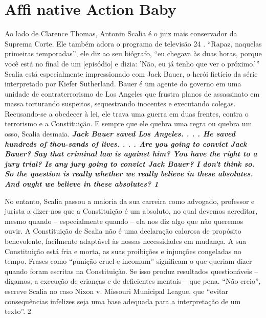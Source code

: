  
 \chapter{Afﬁ native Action Baby}  

 \label{Afﬁ native Action Baby}  
 
 
\par
 
 
 \textit{	}  

 
\par
 
 
 
\par
 

 \textbf{\textit{	} }  

 
\par
 
Ao lado de Clarence Thomas, Antonin Scalia é o juiz mais conservador da Suprema Corte. Ele também adora o programa de televisão
 {\color{blue} 24}  
. “Rapaz, naquelas primeiras temporadas”, ele diz ao seu biógrafo, “eu chegava às duas horas, porque você está no final de um [episódio] e dizia: 'Não, eu já tenho que ver o próximo.'” Scalia está especialmente impressionado com Jack Bauer, o herói fictício da série interpretado por Kiefer Sutherland. Bauer é um agente do governo em uma unidade de contraterrorismo de Los Angeles que frustra planos de assassinato em massa torturando suspeitos, sequestrando inocentes e executando colegas. Recusando-se a obedecer à lei, ele trava uma guerra em duas frentes, contra o terrorismo e a Constituição. E sempre que ele quebra uma regra ou quebra um osso, Scalia desmaia.
 \textbf{\textit{Jack Bauer saved Los Angeles. . . . He saved hundreds of thou-sands of lives. . . . Are you going to convict Jack Bauer? Say that criminal law is against him? You have the right to a jury trial? Is any jury going to convict Jack Bauer? I don’t think so. So the question is really whether we really believe in these absolutes. And ought we believe in these absolutes? 1} } 

 
\par
 
No entanto, Scalia passou a maioria da sua carreira como advogado, professor e jurista a dizer-nos que a Constituição é um absoluto, no qual devemos acreditar, mesmo quando – especialmente quando – ela nos diz algo que não queremos ouvir. A Constituição de Scalia não é uma declaração calorosa de propósito benevolente, facilmente adaptável às nossas necessidades em mudança. A sua Constituição está fria e morta, as suas proibições e injunções congeladas no tempo. Frases como “punição cruel e incomum” significam o que queriam dizer quando foram escritas na Constituição. Se isso produz resultados questionáveis ​​– digamos, a execução de crianças e de deficientes mentais – que pena. “Não creio”, escreve Scalia no caso Nixon v. Missouri Municipal League, que “evitar consequências infelizes seja uma base adequada para a interpretação de um texto”.
 {\color{blue} 2}  

